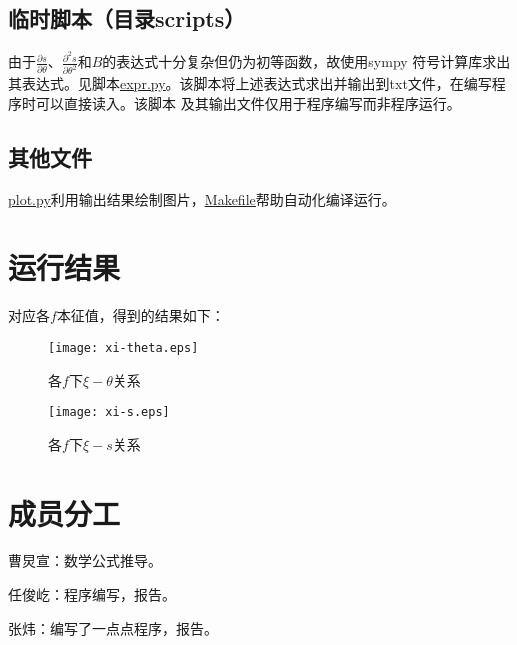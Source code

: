 \documentclass{ctexart}
\def\file#1#2{\href{#1/#2}{\underline{#2}}}
\begin{document}
    \subsection{临时脚本（目录scripts）}
        由于$\frac{\partial s}{\partial\theta}$、$\frac{\partial^2s}{\partial\theta^2}$和$B$的表达式十分复杂但仍为初等函数，故使用sympy
        符号计算库求出其表达式。见脚本\file{scripts}{expr.py}。该脚本将上述表达式求出并输出到txt文件，在编写程序时可以直接读入。该脚本
        及其输出文件仅用于程序编写而非程序运行。
    \subsection{其他文件}
        \file{.}{plot.py}利用输出结果绘制图片，\href{./Makefile}{\underline{Makefile}}帮助自动化编译运行。

\section{运行结果}
    对应各$f$本征值，得到的结果如下：\\
    \begin{figure}[hb]
        \centering
        \texttt{[image: xi-theta.eps]}
        \caption{\small 各$f$下$\xi-\theta$关系}
    \end{figure}
    \begin{figure}[ht]
        \centering
        \texttt{[image: xi-s.eps]}
        \caption{\small 各$f$下$\xi-s$关系}
    \end{figure}

\section{成员分工}
    曹炅宣：数学公式推导。\par
    任俊屹：程序编写，报告。\par
    张炜：编写了一点点程序，报告。\par
\end{document}
